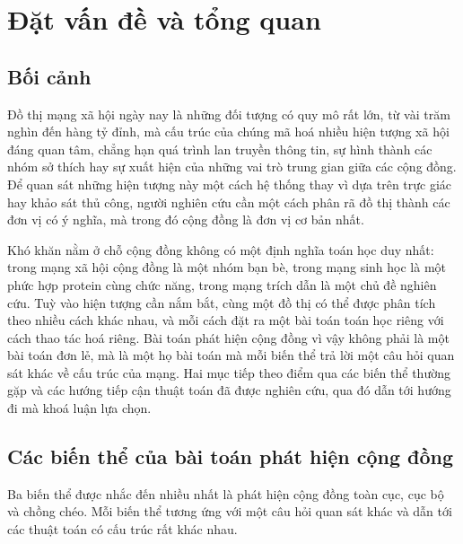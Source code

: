 
\chapter{Đặt vấn đề và tổng quan}
\label{chap:dat-van-de}

\section{Bối cảnh}
\label{sec:boi-canh}

Đồ thị mạng xã hội ngày nay là những đối tượng có quy mô rất lớn, từ vài trăm nghìn đến hàng tỷ đỉnh, mà cấu trúc của chúng mã hoá nhiều hiện tượng xã hội đáng quan tâm, chẳng hạn quá trình lan truyền thông tin, sự hình thành các nhóm sở thích hay sự xuất hiện của những vai trò trung gian giữa các cộng đồng. Để quan sát những hiện tượng này một cách hệ thống thay vì dựa trên trực giác hay khảo sát thủ công, người nghiên cứu cần một cách phân rã đồ thị thành các đơn vị có ý nghĩa, mà trong đó cộng đồng là đơn vị cơ bản nhất.

Khó khăn nằm ở chỗ cộng đồng không có một định nghĩa toán học duy nhất: trong mạng xã hội cộng đồng là một nhóm bạn bè, trong mạng sinh học là một phức hợp protein cùng chức năng, trong mạng trích dẫn là một chủ đề nghiên cứu. Tuỳ vào hiện tượng cần nắm bắt, cùng một đồ thị có thể được phân tích theo nhiều cách khác nhau, và mỗi cách đặt ra một bài toán toán học riêng với cách thao tác hoá riêng. Bài toán phát hiện cộng đồng vì vậy không phải là một bài toán đơn lẻ, mà là một họ bài toán mà mỗi biến thể trả lời một câu hỏi quan sát khác về cấu trúc của mạng. Hai mục tiếp theo điểm qua các biến thể thường gặp và các hướng tiếp cận thuật toán đã được nghiên cứu, qua đó dẫn tới hướng đi mà khoá luận lựa chọn.

\section{Các biến thể của bài toán phát hiện cộng đồng}
\label{sec:bien-the}

Ba biến thể được nhắc đến nhiều nhất là phát hiện cộng đồng toàn cục, cục bộ và chồng chéo. Mỗi biến thể tương ứng với một câu hỏi quan sát khác và dẫn tới các thuật toán có cấu trúc rất khác nhau.

